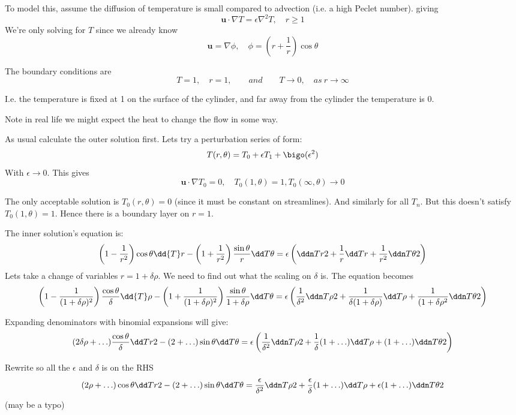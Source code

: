 \documentclass{/home/janmebows/Documents/LatexTemplates/myassignment}
\begin{document}
To model this, assume the diffusion of temperature is small compared to advection (i.e. a high Peclet number). giving
\[\mathbf{u}\cdot \nabla T = \epsilon \nabla^2 T, \quad r \geq 1\]
We're only solving for $T$ since we already know
\[\mathbf{u} = \nabla\phi,\quad \phi = \left(r + \frac1r\right)\cos\theta\]

The boundary conditions are 
\[T=1,\quad r=1, \qquad and \qquad T\to 0,\quad as \ r\to \infty\]

I.e. the temperature is fixed at 1 on the surface of the cylinder, and far away from the cylinder the temperature is $0$.

Note in real life we might expect the heat to change the flow in some way.


As usual calculate the outer solution first.
Lets try a perturbation series of form:
\[T(r,\theta) = T_0 + \epsilon T_1 + \bigo(\epsilon^2)\]
With $\epsilon\to 0$. This gives
\[\mathbf{u} \cdot \nabla T_0 = 0 ,\quad T_0(1,\theta) = 1, T_0(\infty,\theta) \to 0\]

The only acceptable solution is $T_0(r,\theta) =0$ (since it must be constant on streamlines). And similarly for all $T_n$. But this doesn't satisfy $T_0(1,\theta)=1$. Hence there is a boundary layer on $r=1$.

The inner solution's equation is:
\[\left(1-\frac1{r^2}\right)\cos\theta \dd{T}r - \left(1 + \frac1{r^2}\right)\frac{\sin \theta}r \dd T\theta  = \epsilon\left(\ddn Tr2 + \frac1r \dd Tr + \frac1{r^2} \ddn T\theta 2\right)\]
Lets take a change of variables $r = 1 + \delta \rho$. We need to find out what the scaling on $\delta$ is.
The equation becomes
\begin{align*}
    \left(1-\frac1{(1 + \delta \rho)^2}\right)\frac{\cos\theta}\delta  \dd{T}\rho - \left(1 + \frac1{(1 + \delta \rho)^2}\right)\frac{\sin \theta}{1+\delta \rho} \dd T\theta  = \epsilon\left(\frac{1}{\delta^2}\ddn T\rho2 + \frac1{\delta(1+\delta \rho)} \dd T\rho + \frac1{(1+\delta \rho^2} \ddn T\theta 2\right)
\end{align*}

Expanding denominators with binomial expansions will give:
\[(2 \delta \rho + \hdots) \frac{\cos\theta}{\delta} \dd Tr2 - (2 +\hdots) \sin \theta \dd T \theta = \epsilon\left(\frac{1}{\delta^2}\ddn T\rho2 + \frac1{\delta}(1+\hdots) \dd T\rho + (1+\hdots) \ddn T\theta 2\right)\]

Rewrite so all the $\epsilon$ and $\delta$ is on the RHS
\[(2 \rho + \hdots) \cos\theta \dd Tr2 - (2 +\hdots) \sin \theta \dd T \theta = \frac{\epsilon}{\delta^2}\ddn T\rho2 + \frac\epsilon{\delta}(1+\hdots) \dd T\rho + \epsilon(1+\hdots) \ddn T\theta 2\]
(may be a typo)
\end{document}
